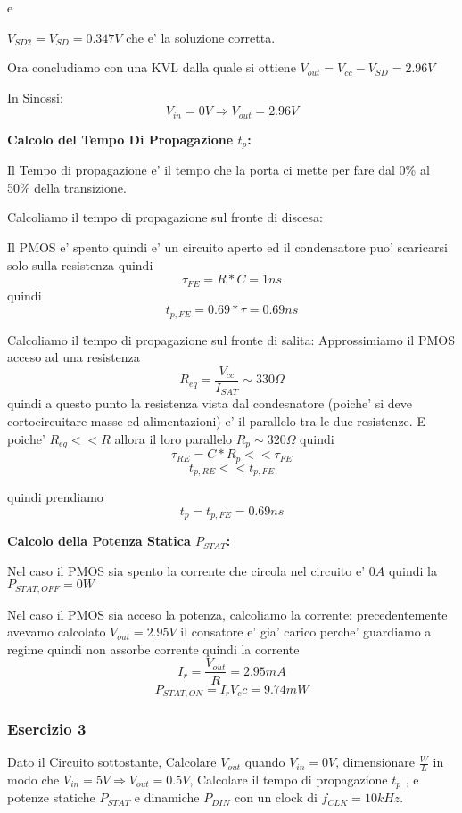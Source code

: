 \documentclass[\main/main.tex]{subfiles}
\begin{document}
e

$V_{SD2} = V_{SD} = 0.347V$ che e' la soluzione corretta.

Ora concludiamo con una KVL dalla quale si ottiene $V_{out} = V_{cc} - V_{SD} = 2.96V$

In Sinossi:
\[V_{in} = 0V \Rightarrow V_{out} = 2.96V\]

\textbf{Calcolo del Tempo Di Propagazione $t_p$:}

Il Tempo di propagazione e' il tempo che la porta ci mette per fare dal 0\% al 50\% della transizione.

Calcoliamo il tempo di propagazione sul fronte di discesa:

Il PMOS e' spento quindi e' un circuito aperto ed il condensatore puo' scaricarsi solo sulla resistenza quindi \[\tau_{FE} = R * C = 1ns\]
quindi \[t_{p,FE} = 0.69 * \tau = 0.69ns\]

Calcoliamo il tempo di propagazione sul fronte di salita:
Approssimiamo il PMOS acceso ad una resistenza
\[R_{eq} = \frac{V_{cc}}{I_{SAT}} \sim 330\Omega\]
quindi a questo punto la resistenza vista dal condesnatore (poiche' si deve cortocircuitare masse ed alimentazioni) e' il parallelo tra le due resistenze.
E poiche' $R_{eq} << R$ allora il loro parallelo $R_p \sim 320\Omega$
quindi \[\tau_{RE} = C * R_p << \tau_{FE}\]
\[t_{p,RE} << t_{p,FE}\]

quindi prendiamo \[t_p = t_{p,FE} = 0.69ns\]

\textbf{Calcolo della Potenza Statica $P_{STAT}$:}

Nel caso il PMOS sia spento la corrente che circola nel circuito e' $0A$ quindi la $P_{STAT,OFF} = 0W$

Nel caso il PMOS sia acceso la potenza, calcoliamo la corrente:
precedentemente avevamo calcolato $V_{out} = 2.95V$
il consatore e' gia' carico perche' guardiamo a regime quindi non assorbe corrente
quindi la corrente
\[I_r = \frac{V_{out}}{R} = 2.95mA\] 
\[P_{STAT,ON} = I_r V_cc = 9.74mW\]


\clearpage
\subsubsection{Esercizio 3}
Dato il Circuito sottostante,
Calcolare $V_{out}$ quando $V_{in} = 0V$, dimensionare $\frac{W}{L}$ in modo che $V_{in} = 5V \Rightarrow V_{out} = 0.5V$, Calcolare il tempo di propagazione  $t_p$ , e potenze statiche $P_{STAT}$ e dinamiche $P_{DIN}$ con un clock di $f_{CLK} = 10kHz$.
\end{document}
